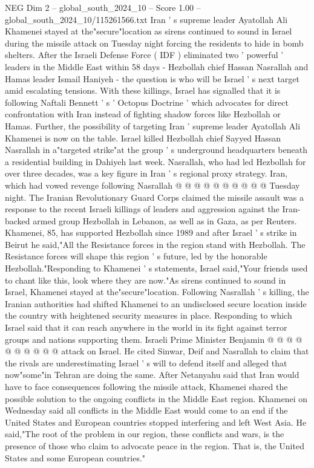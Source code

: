 \begin{textsample}{NEG Dim 2 – global\_south\_2024\_10 – Score 1.00 – global\_south\_2024\_10/115261566.txt}  \label{ex:f2_neg_311}
Iran ' s supreme leader Ayatollah Ali Khamenei stayed at the"secure"location as sirens continued to sound in Israel during the missile attack on Tuesday night forcing the residents to hide in bomb shelters.
After the Israeli Defense Force ( IDF ) eliminated two ' powerful ' leaders in the Middle East within 58 days - Hezbollah chief Hassan Nasrallah and Hamas leader Ismail Haniyeh - the question is who will be Israel ' s next target amid escalating tensions.
With these killings, Israel has signalled that it is following Naftali Bennett ' s ' Octopus Doctrine ' which advocates for direct confrontation with Iran instead of fighting shadow forces like Hezbollah or Hamas.
Further, the possibility of targeting Iran ' supreme leader Ayatollah Ali Khamenei is now on the table.
Israel killed Hezbollah chief Sayyed Hassan Nasrallah in a"targeted strike"at the group ' s underground headquarters beneath a residential building in Dahiyeh last week.
Nasrallah, who had led Hezbollah for over three decades, was a key figure in Iran ' s regional proxy strategy.
Iran, which had vowed revenge following Nasrallah @ @ @ @ @ @ @ @ @ @ Tuesday night.
The Iranian Revolutionary Guard Corps claimed the missile assault was a response to the recent Israeli killings of leaders and aggression against the Iran-backed armed group Hezbollah in Lebanon, as well as in Gaza, as per Reuters.
Khamenei, 85, has supported Hezbollah since 1989 and after Israel ' s strike in Beirut he said,"All the Resistance forces in the region stand with Hezbollah.
The Resistance forces will shape this region ' s future, led by the honorable Hezbollah."Responding to Khamenei ' s statements, Israel said,"Your friends used to chant like this, look where they are now."As sirens continued to sound in Israel, Khamenei stayed at the"secure"location.
Following Nasrallah ' s killing, the Iranian authorities had shifted Khamenei to an undisclosed secure location inside the country with heightened security measures in place.
Responding to which Israel said that it can reach anywhere in the world in its fight against terror groups and nations supporting them.
Israeli Prime Minister Benjamin @ @ @ @ @ @ @ @ @ @ attack on Israel.
He cited Sinwar, Deif and Nasrallah to claim that the rivals are underestimating Israel ' s will to defend itself and alleged that now"some"in Tehran are doing the same.
After Netanyahu said that Iran would have to face consequences following the missile attack, Khamenei shared the possible solution to the ongoing conflicts in the Middle East region.
Khamenei on Wednesday said all conflicts in the Middle East would come to an end if the United States and European countries stopped interfering and left West Asia.
He said,"The root of the problem in our region, these conflicts and wars, is the presence of those who claim to advocate peace in the region.
That is, the United States and some European countries."

\end{textsample}
